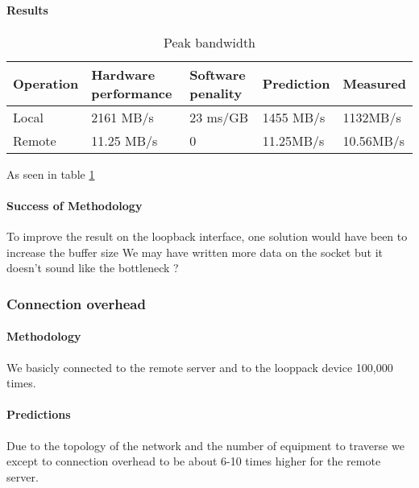 \paragraph{Results}
\begin{table}[h]
\begin{center}
\begin{tabular}{| l | l | l | l | l |}
\hline
Operation & Hardware performance & Software penality & Prediction & Measured \\
\hline
Local 	&  2161 MB/s	& 23 ms/GB	&  1455 MB/s &  1132MB/s \\
\hline
Remote 	&  11.25 MB/s	& 0 &  11.25MB/s	&  10.56MB/s \\
\hline

\end{tabular}
\end{center}
\caption{Peak bandwidth\label{tab:peak-bandwidth}}
\end{table}

As seen in table \ref{tab:peak-bandwidth}
\paragraph{Success of Methodology}
To improve the result on the loopback interface, one solution would have been to
increase the buffer size We may have written more data on the socket but it doesn't sound like the
bottleneck ?


\subsubsection{Connection overhead}
\paragraph{Methodology}
We basicly connected to the remote server and to the looppack device 100,000 times.

\paragraph{Predictions}
Due to the topology of the network and the number of equipment to traverse we
except to connection overhead to be about 6-10 times higher for the remote server.
